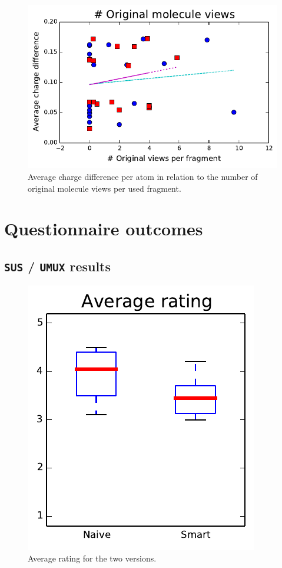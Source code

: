 \begin{figure}
\center
\includegraphics[width=.9\textwidth]{img/graphs/3a_03.pdf}
\caption{Average charge difference per atom in relation to the number of original molecule views per used fragment.}
\end{figure}


\section{Questionnaire outcomes}
\nlipsum

\subsection{\texttt{SUS} / \texttt{UMUX} results}
\nlipsum

\begin{figure}
\center
\includegraphics[width=.9\textwidth]{img/graphs/4a_10.pdf}
\caption{Average rating for the two versions.}
\end{figure}

